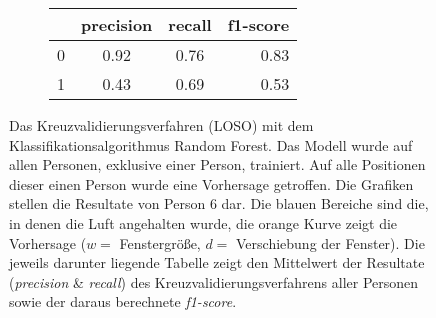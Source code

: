 \begin{figure}[ht!]
  \begin{subfigure}{1\textwidth}
      \begin{center}
          \begin{tabular}{ | l | c | c | r | }
            \hline
             & precision & recall & f1-score\\ \hline
            0 & 0.92 & 0.76 & 0.83\\ \hline
            1 & 0.43 & 0.69 & 0.53\\
            \hline
          \end{tabular}
      \end{center}
  \end{subfigure}
    \caption{Das Kreuzvalidierungsverfahren (LOSO) mit dem Klassifikationsalgorithmus Random Forest. Das Modell wurde auf allen Personen, exklusive einer Person, trainiert. Auf alle Positionen dieser einen Person wurde eine Vorhersage getroffen. Die Grafiken stellen die Resultate von Person 6 dar. Die blauen Bereiche sind die, in denen die Luft angehalten wurde, die orange Kurve zeigt die Vorhersage ($w=$ Fenstergröße, $d=$ Verschiebung der Fenster). Die jeweils darunter liegende Tabelle zeigt den Mittelwert der Resultate (\textit{precision} \& \textit{recall}) des Kreuzvalidierungsverfahrens aller Personen sowie der daraus berechnete \textit{f1-score}.}
\label{evaluation:random_forest_loso:person6}
\end{figure}

\newpage

